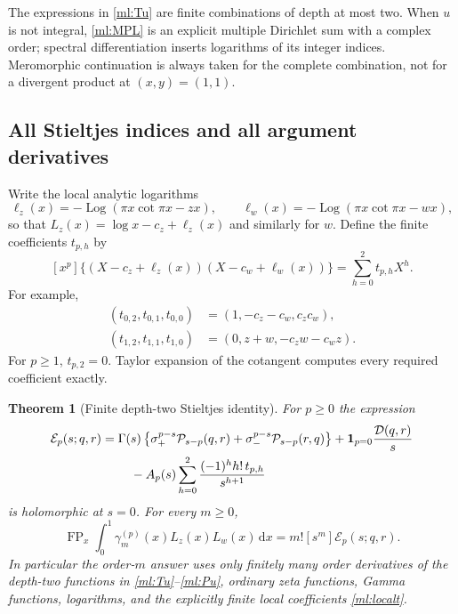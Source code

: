 \documentclass[11pt]{article}
\numberwithin{equation}{section}
\theoremstyle{plain}
\newtheorem{theorem}{Theorem}[section]
\theoremstyle{definition}
\theoremstyle{remark}
\DeclareMathOperator{\Log}{Log}
\DeclareMathOperator{\FP}{FP}
\newcommand{\dd}{\,\mathrm d}
\begin{document}
The expressions in \eqref{ml:Tu} are finite combinations of depth at
most two. When $u$ is not integral, \eqref{ml:MPL} is an explicit
multiple Dirichlet sum with a complex order; spectral differentiation
inserts logarithms of its integer indices. Meromorphic continuation is
always taken for the complete combination, not for a divergent product
at $(x,y)=(1,1)$.

\subsection{All Stieltjes indices and all argument derivatives}

Write the local analytic logarithms
\[
 \ell_z(x)=-\Log(\pi x\cot\pi x-zx),\qquad
 \ell_w(x)=-\Log(\pi x\cot\pi x-wx),
\]
so that $L_z(x)=\log x-c_z+\ell_z(x)$ and similarly for $w$.
Define the finite coefficients $t_{p,h}$ by
\begin{equation}\label{ml:localt}
 [x^p]\{(X-c_z+\ell_z(x))(X-c_w+\ell_w(x))\}
                            =\sum_{h=0}^2t_{p,h}X^h.
\end{equation}
For example,
\begin{align*}
 (t_{0,2},t_{0,1},t_{0,0})&=(1,-c_z-c_w,c_zc_w),\\
 (t_{1,2},t_{1,1},t_{1,0})&=(0,z+w,-c_zw-c_wz).
\end{align*}
For $p\ge1$, $t_{p,2}=0$. Taylor expansion of the cotangent computes
every required coefficient exactly.

\begin{theorem}[Finite depth-two Stieltjes identity]
\label{ml:allStieltjes}
For $p\ge0$ the expression
\begin{align}
 \mathcal E_p(s;q,r)={}&\Gamma(s)
       \left\{\sigma_+^{p-s}\mathcal P_{s-p}(q,r)
                  +\sigma_-^{p-s}\mathcal P_{s-p}(r,q)\right\}
        +\mathbf1_{p=0}\frac{\mathcal D(q,r)}s\notag\\
 &\quad-A_p(s)\sum_{h=0}^2\frac{(-1)^hh!\,t_{p,h}}{s^{h+1}}
       \label{ml:E}
\end{align}
is holomorphic at $s=0$. For every $m\ge0$,
\begin{equation}\label{ml:allindex}
 \boxed{\displaystyle
 \FP_x\int_0^1\gamma_m^{(p)}(x)L_z(x)L_w(x)\dd x
                      =m![s^m]\mathcal E_p(s;q,r).}
\end{equation}
In particular the order-$m$ answer uses only finitely many order
derivatives of the depth-two functions in \eqref{ml:Tu}--\eqref{ml:Pu},
ordinary zeta functions, Gamma functions, logarithms, and the explicitly
finite local coefficients \eqref{ml:localt}.
\end{theorem}
\end{document}
